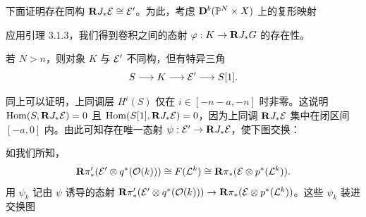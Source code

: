 下面证明存在同构 $\mathbf{R} J_{*}\mathcal{E}\cong\mathcal{E}'$。为此，考虑 $\mathbf{D}^{b}(\mathbb{P}^{N}\times X)$ 上的复形映射
\begin{center}\end{center}
应用引理 3.1.3，我们得到卷积之间的态射 $\varphi:K\to\mathbf{R} J_{*}G$ 的存在性。

若 $N>n$，则对象 $K$ 与 $\mathcal{E}'$ 不同构，但有特异三角
\begin{equation*}
S\longrightarrow K\longrightarrow\mathcal{E}'\longrightarrow S[1].
\end{equation*}

同上可以证明，上同调层 $H^{i}(S)$ 仅在 $i\in[-n-a,-n]$ 时非零。这说明 $\operatorname{Hom}(S,\mathbf{R} J_{*}\mathcal{E})=0$ 且 $\operatorname{Hom}(S[1],\mathbf{R} J_{*}\mathcal{E})=0$，因为上同调 $\mathbf{R} J_{*}\mathcal{E}$ 集中在闭区间 $[-a,0]$ 内。由此可知存在唯一态射 $\psi:\mathcal{E}'\to\mathbf{R} J_{*}\mathcal{E}$，使下图交换：

如我们所知，
\begin{equation*}
\mathbf{R}\pi'_{*}(\mathcal{E}'\otimes q^{*}(\mathcal{O}(k)))\cong F(\mathcal{L}^{k})\cong\mathbf{R}\pi_{*}(\mathcal{E}\otimes p^{*}(\mathcal{L}^{k})).
\end{equation*}
用 $\psi_{k}$ 记由 $\psi$ 诱导的态射 $\mathbf{R}\pi'_{*}(\mathcal{E}'\otimes q^{*}(\mathcal{O}(k)))\to\mathbf{R}\pi_{*}(\mathcal{E}\otimes p^{*}(\mathcal{L}^{k}))$。这些 $\psi_{k}$ 装进交换图
\begin{center}\end{center}

